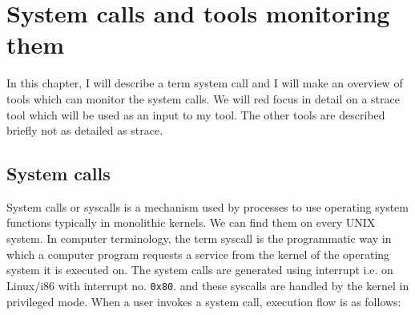 \chapter{System calls and tools monitoring them}
\label{chap:syscalls}
In this chapter, I will describe a term system call and I will make an overview of tools which can monitor the system calls.
We will red focus in detail on a strace tool which will be used as an input to my tool.
The other tools are described briefly not as detailed as strace.

\section{System calls}
System calls or syscalls is a mechanism used by processes to use operating system functions typically in monolithic kernels.
We can find them on every UNIX system.
In computer terminology, the term syscall is the programmatic way in which a computer program requests a service from the kernel of the operating system it is executed on. The system calls are generated using interrupt i.e. on Linux/i86 with interrupt no. \texttt{0x80}. and these syscalls are handled by the kernel in privileged mode.
When a user invokes a system call, execution flow is as follows:
